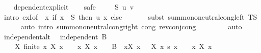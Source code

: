 \begin{isabellebody}
%
\isadelimproof
\ \ %
\endisadelimproof
%
\isatagproof
{}\isamarkupfalse%
\ dependent{\isacharunderscore}{\kern0pt}explicit\isanewline
\ \ \isamarkupfalse%
\ safe\isanewline
\ \ \isamarkupfalse%
\ \ S\ u\ v\isanewline
\ \ \ \ \isamarkupfalse%
\ {\isacharparenleft}{\kern0pt}intro\ exI{\isacharbrackleft}{\kern0pt}of\ {\isacharunderscore}{\kern0pt}\ {\isachardoublequoteopen}{\isasymlambda}x{\isachardot}{\kern0pt}\ if\ x\ {\isasymin}\ S\ then\ u\ x\ else\ {}{\isachardoublequoteclose}{\isacharbrackright}{\kern0pt}{\isacharparenright}{\kern0pt}\isanewline
\ \ \ \ \isamarkupfalse%
\ {\isacharparenleft}{\kern0pt}subst\ sum{\isachardot}{\kern0pt}mono{\isacharunderscore}{\kern0pt}neutral{\isacharunderscore}{\kern0pt}cong{\isacharunderscore}{\kern0pt}left{\isacharbrackleft}{\kern0pt}\ T{\isacharequal}{\kern0pt}S{\isacharbrackright}{\kern0pt}{\isacharparenright}{\kern0pt}\isanewline
\ \ \ \ \isamarkupfalse%
\ {\isacharparenleft}{\kern0pt}auto\ intro{\isacharbang}{\kern0pt}{\isacharcolon}{\kern0pt}\ sum{\isachardot}{\kern0pt}mono{\isacharunderscore}{\kern0pt}neutral{\isacharunderscore}{\kern0pt}cong{\isacharunderscore}{\kern0pt}right\ cong{\isacharcolon}{\kern0pt}\ rev{\isacharunderscore}{\kern0pt}conj{\isacharunderscore}{\kern0pt}cong{\isacharparenright}{\kern0pt}\isanewline
\ \ \ \ \isamarkupfalse%
\isanewline
\ \ \isamarkupfalse%
\ auto\isanewline
\ \ \isamarkupfalse%
%
\endisatagproof
{\isafoldproof}%
%
\isadelimproof
\isanewline
%
\endisadelimproof
\isanewline
{}\isamarkupfalse%
\ independent{\isacharunderscore}{\kern0pt}alt{\isacharcolon}{\kern0pt}\isanewline
\ \ {\isachardoublequoteopen}independent\ B\ {\isasymlongleftrightarrow}\isanewline
\ \ \ \ {\isacharparenleft}{\kern0pt}{\isasymforall}X{\isachardot}{\kern0pt}\ finite\ {\isacharbraceleft}{\kern0pt}x{\isachardot}{\kern0pt}\ X\ x\ {\isasymnoteq}\ {}{\isacharbraceright}{\kern0pt}\ {\isasymlongrightarrow}\ {\isacharbraceleft}{\kern0pt}x{\isachardot}{\kern0pt}\ X\ x\ {\isasymnoteq}\ {}{\isacharbraceright}{\kern0pt}\ {\isasymsubseteq}\ B\ {\isasymlongrightarrow}\ {\isacharparenleft}{\kern0pt}{\isasymSum}x{\isacharbar}{\kern0pt}X\ x\ {\isasymnoteq}\ {}{\isachardot}{\kern0pt}\ X\ x\ {\isacharasterisk}{\kern0pt}s\ x{\isacharparenright}{\kern0pt}\ {\isacharequal}{\kern0pt}\ {}\ {\isasymlongrightarrow}\ {\isacharparenleft}{\kern0pt}{\isasymforall}x{\isachardot}{\kern0pt}\ X\ x\ {\isacharequal}{\kern0pt}\ {}{\isacharparenright}{\kern0pt}{\isacharparenright}{\kern0pt}{\isachardoublequoteclose}\isanewline

\end{isabellebody}
